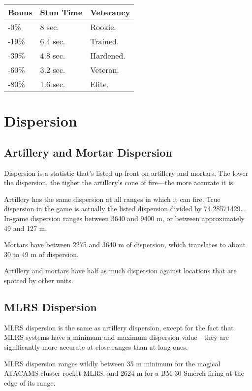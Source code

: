 \documentclass{article}
\begin{document}
\begin{center}
    \begin{tabular}{ | l | l | l |}
    \hline
    Bonus & Stun Time & Veterancy \\ \hline
    -0\%  & 8 sec. &  Rookie. \\
    -19\% & 6.4 sec. & Trained. \\
    -39\% & 4.8 sec. & Hardened. \\
    -60\% & 3.2 sec. & Veteran. \\
    -80\% & 1.6 sec. & Elite. \\
    \hline
    \end{tabular}
\end{center}

\section{Dispersion}

\subsection{Artillery and Mortar Dispersion}

Dispersion is a statistic that's listed up-front on artillery and mortars. The
lower the dispersion, the tigher the artillery's cone of fire---the more
accurate it is.

Artillery has the same dispersion at all ranges in which it can fire. True
dispersion in the game is actually the listed dispersion divided by
74.28571429\ldots . In-game dispersion ranges between 3640 and 9400 m, or
between approximately 49 and 127 m.

Mortars have between 2275 and 3640 m of dispersion, which translates to about 30
to 49 m of dispersion.

Artillery and mortars have half as much dispersion against locations that are
spotted by other units.

\subsection{MLRS Dispersion}
MLRS dispersion is the same as artillery dispersion, except for the fact that
MLRS systems have a minimum and maximum dispersion value---they are
significantly more accurate at close ranges than at long ones.

MLRS dispersion ranges wildly between 35 m minimum for the magical ATACAMS
cluster rocket MLRS, and 2624 m for a BM-30 Smerch firing at the edge of its
range.
\end{document}
